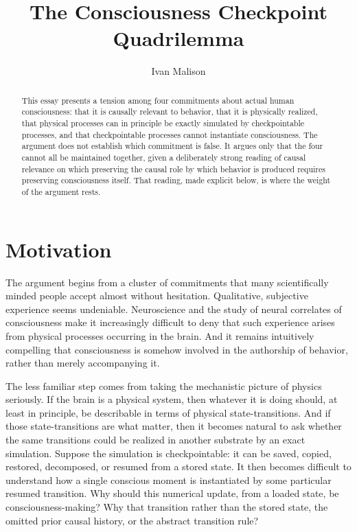 \documentclass[11pt]{article}
\title{The Consciousness Checkpoint Quadrilemma}
\author{Ivan Malison}
\date{}
\begin{document}
\maketitle

\begin{abstract}
  This essay presents a tension among four commitments about actual human
  consciousness: that it is causally relevant to behavior, that it is physically
  realized, that physical processes can in principle be exactly simulated by
  checkpointable processes, and that checkpointable processes cannot instantiate
  consciousness. The argument does not establish which commitment is false. It
  argues only that the four cannot all be maintained together, given a
  deliberately strong reading of causal relevance on which preserving the
  causal role by which behavior is produced requires preserving consciousness
  itself. That reading, made explicit below, is where the weight of the
  argument rests.
\end{abstract}

\section{Motivation}

The argument begins from a cluster of commitments that many scientifically
minded people accept almost without hesitation. Qualitative, subjective
experience seems undeniable. Neuroscience and the study of neural correlates of
consciousness make it increasingly difficult to deny that such experience
arises from physical processes occurring in the brain. And it remains
intuitively compelling that consciousness is somehow involved in the authorship
of behavior, rather than merely accompanying it.

The less familiar step comes from taking the mechanistic picture of physics
seriously. If the brain is a physical system, then whatever it is doing should,
at least in principle, be describable in terms of physical state-transitions.
And if those state-transitions are what matter, then it becomes natural to ask
whether the same transitions could be realized in another substrate by an exact
simulation. Suppose the simulation is checkpointable: it can be saved, copied,
restored, decomposed, or resumed from a stored state. It then becomes difficult
to understand how a single conscious moment is instantiated by some particular
resumed transition. Why should this numerical update, from a loaded state, be
consciousness-making? Why that transition rather than the stored state, the
omitted prior causal history, or the abstract transition rule?
\end{document}
